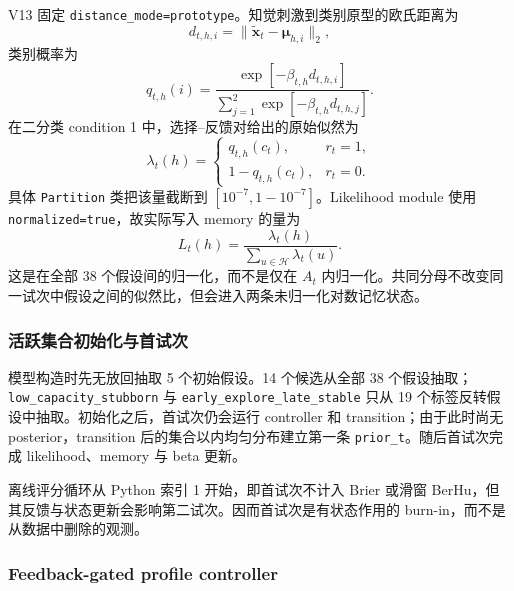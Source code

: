 V13 固定 \texttt{distance\_mode=prototype}。知觉刺激到类别原型的欧氏距离为
\begin{equation}
    d_{t,h,i}=\|\widetilde{\mathbf x}_t-\boldsymbol\mu_{h,i}\|_2,
\end{equation}
类别概率为
\begin{equation}
    q_{t,h}(i)
    =\frac{\exp[-\beta_{t,h}d_{t,h,i}]}
    {\sum_{j=1}^{2}\exp[-\beta_{t,h}d_{t,h,j}]}.
    \label{eq:modelv13-category-probability}
\end{equation}
在二分类 condition 1 中，选择--反馈对给出的原始似然为
\begin{equation}
    \lambda_t(h)=
    \begin{cases}
        q_{t,h}(c_t),&r_t=1,\\
        1-q_{t,h}(c_t),&r_t=0.
    \end{cases}
    \label{eq:modelv13-feedback-likelihood}
\end{equation}
具体 \texttt{Partition} 类把该量截断到 $[10^{-7},1-10^{-7}]$。Likelihood module 使用 \texttt{normalized=true}，故实际写入 memory 的量为
\begin{equation}
    L_t(h)=\frac{\lambda_t(h)}{\sum_{u\in\mathcal H}\lambda_t(u)}.
    \label{eq:modelv13-normalized-likelihood}
\end{equation}
这是在全部 38 个假设间的归一化，而不是仅在 $A_t$ 内归一化。共同分母不改变同一试次中假设之间的似然比，但会进入两条未归一化对数记忆状态。


\subsubsection{活跃集合初始化与首试次}

模型构造时先无放回抽取 5 个初始假设。14 个候选从全部 38 个假设抽取；\texttt{low\_capacity\_stubborn} 与 \texttt{early\_explore\_late\_stable} 只从 19 个标签反转假设中抽取。初始化之后，首试次仍会运行 controller 和 transition；由于此时尚无 posterior，transition 后的集合以内均匀分布建立第一条 \texttt{prior\_t}。随后首试次完成 likelihood、memory 与 beta 更新。

离线评分循环从 Python 索引 1 开始，即首试次不计入 Brier 或滑窗 BerHu，但其反馈与状态更新会影响第二试次。因而首试次是有状态作用的 burn-in，而不是从数据中删除的观测。


\subsubsection{Feedback-gated profile controller}

